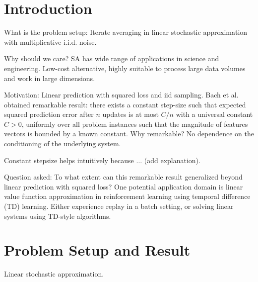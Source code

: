 \documentclass{article}
\begin{document}
 

%
\section{Introduction}
What is the problem setup:
Iterate averaging in linear stochastic approximation with multiplicative i.i.d. noise.

Why should we care?
SA has wide range of applications in science and engineering. Low-cost alternative,
highly suitable to process large data volumes and work in large dimensions.

Motivation: Linear prediction with squared loss and iid sampling. Bach et al. obtained remarkable result:
there exists a constant step-size 
such that expected squared prediction error
after $n$ updates is at most $C/n$ with a universal constant $C>0$, 
uniformly over all problem instances
such that the magnitude of features vectors is bounded by a known constant.
Why remarkable? No dependence on the conditioning of the underlying system.

Constant stepsize helps intuitively because $\dots$ (add explanation).

Question asked: To what extent can this remarkable result generalized beyond linear prediction 
with squared loss?
One potential application domain is
linear value function approximation in reinforcement learning using temporal difference (TD) learning.
Either experience replay in a batch setting, or solving linear systems using TD-style algorithms.

\section{Problem Setup and Result}
Linear stochastic approximation.
\end{document}
